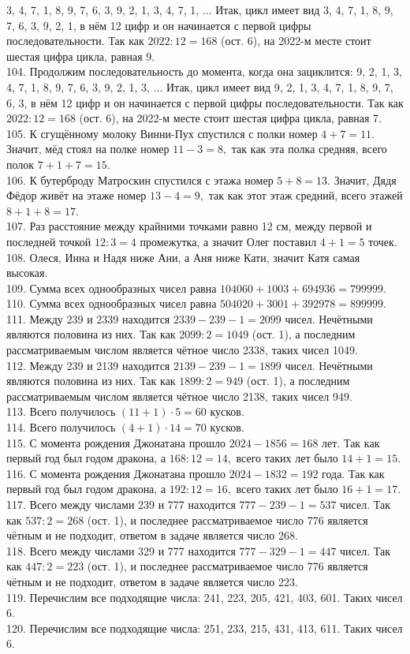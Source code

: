 \documentclass[12pt]{article}
\begin{document}
3, 4, 7, 1, 8, 9, 7, 6, 3, 9, 2, 1, 3, 4, 7, 1, ... Итак, цикл имеет вид
3, 4, 7, 1, 8, 9, 7, 6, 3, 9, 2, 1, в нём 12 цифр и он начинается с первой цифры последовательности. Так как $2022:12=168$ (ост. 6), на 2022-м месте стоит шестая цифра цикла, равная 9.\\
104. Продолжим последовательность до момента, когда она зациклится:
9, 2, 1, 3, 4, 7, 1, 8, 9, 7, 6, 3, 9, 2, 1, 3, ... Итак, цикл имеет вид
9, 2, 1, 3, 4, 7, 1, 8, 9, 7, 6, 3, в нём 12 цифр и он начинается с первой цифры последовательности. Так как $2022:12=168$ (ост. 6), на 2022-м месте стоит шестая цифра цикла, равная 7.\\
105. К сгущённому молоку Винни-Пух спустился с полки номер $4+7=11.$ Значит, мёд стоял на полке номер $11-3=8,$ так как эта полка средняя, всего полок $7+1+7=15.$\\
106. К бутерброду Матроскин спустился с этажа номер $5+8=13.$ Значит, Дядя Фёдор живёт на этаже номер $13-4=9,$ так как этот этаж средний, всего этажей $8+1+8=17.$\\
107. Раз расстояние между крайними точками равно 12 см, между первой и последней точкой $12:3=4$ промежутка, а значит Олег поставил $4+1=5$ точек.\\
108. Олеся, Инна и Надя ниже Ани, а Аня ниже Кати, значит Катя самая высокая.\\
109. Сумма всех однообразных чисел равна $104060+1003+694936=799999.$\\
110. Сумма всех однообразных чисел равна $504020+3001+392978=899999.$\\
111. Между 239 и 2339 находится $2339-239-1=2099$ чисел. Нечётными являются половина из них. Так как $2099:2=1049$ (ост. 1), а последним рассматриваемым числом является чётное число 2338, таких чисел 1049.\\
112. Между 239 и 2139 находится $2139-239-1=1899$ чисел. Нечётными являются половина из них. Так как $1899:2=949$ (ост. 1), а последним рассматриваемым числом является чётное число 2138, таких чисел 949.\\
113. Всего получилось $(11+1)\cdot5=60$ кусков.\\
114. Всего получилось $(4+1)\cdot14=70$ кусков.\\
115. С момента рождения Джонатана прошло $2024-1856=168$ лет. Так как первый год был годом дракона, а $168:12=14,$  всего таких лет было $14+1=15.$\\
116. С момента рождения Джонатана прошло $2024-1832=192$ года. Так как первый год был годом дракона, а $192:12=16,$  всего таких лет было $16+1=17.$\\
117. Всего между числами 239 и 777 находится $777-239-1=537$ чисел. Так как $537:2=268$ (ост. 1), и последнее рассматриваемое число 776 является чётным и не подходит, ответом в задаче является число 268.\\
118. Всего между числами 329 и 777 находится $777-329-1=447$ чисел. Так как $447:2=223$ (ост. 1), и последнее рассматриваемое число 776 является чётным и не подходит, ответом в задаче является число 223.\\
119. Перечислим все подходящие числа: 241, 223, 205, 421, 403, 601. Таких чисел 6.\\
120. Перечислим все подходящие числа: 251, 233, 215, 431, 413, 611. Таких чисел 6.
\newpage
\end{document}
